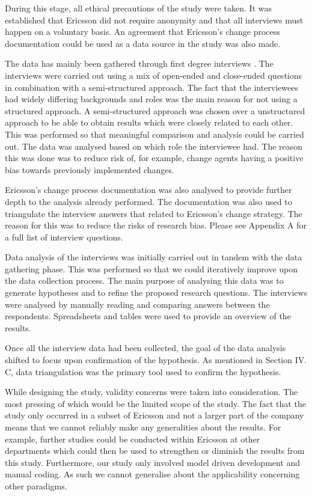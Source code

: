 \documentclass[10pt,twocolumn]{article}
\begin{document}
During this stage, all ethical precautions of the study were taken. It was established that Ericsson did not require anonymity and that all interviews must happen on a voluntary basis. An agreement that Ericsson's change process documentation could be used as a data source in the study was also made. 


The data has mainly been gathered through first degree interviews \cite{lethbridge2005studying}. The interviews were carried out using a mix of open-ended and close-ended questions in combination with a semi-structured approach. The fact that the interviewees had widely differing backgrounds and roles was the main reason for not using a structured approach. A semi-structured approach was chosen over a unstructured approach to be able to obtain results which were closely related to each other. This was performed so that meaningful comparison and analysis could be carried out. The data was analysed based on which role the interviewee had. The reason this was done was to reduce risk of, for example, change agents having a positive bias towards previously implemented changes.

Ericsson's change process documentation was also analysed to provide further depth to the analysis already performed. The documentation was also used to triangulate the interview answers that related to Ericsson's change strategy. The reason for this was to reduce the risks of research bias. Please see Appendix A for a full list of interview questions.

Data analysis of the interviews was initially carried out in tandem with the data gathering phase. This was performed so that we could iteratively improve upon the data collection process. The main purpose of analysing this data was to generate hypotheses and to refine the proposed research questions. The interviews were analysed by manually reading and comparing answers between the respondents. Spreadsheets and tables were used to provide an overview of the results. 

Once all the interview data had been collected, the goal of the data analysis shifted to focus upon confirmation of the hypothesis. As mentioned in Section IV. C, data triangulation was the primary tool used to confirm the hypothesis. 

While designing the study, validity concerns were taken into consideration. The most pressing of which would be the limited scope of the study. The fact that the study only occurred in a subset of Ericsson and not a larger part of the company means that we cannot reliably make any generalities about the results. For example, further studies could be conducted within Ericsson at other departments which could then be used to strengthen or diminish the results from this study. Furthermore, our study only involved model driven development and manual coding. As such we cannot generalise about the applicability concerning other paradigms.
\end{document}
